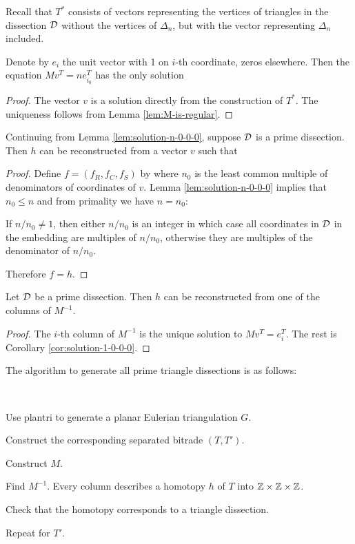 Recall that $T^*$ consists of vectors representing the vertices of triangles in the dissection $\mathcal D$ without the vertices of $\Delta_n$, but with the vector representing $\Delta_n$ included.

\begin{lem}
\label{lem:solution-n-0-0-0}
Denote by $e_i$ the unit vector with 1 on $i$-th coordinate, zeros elsewhere. Then the equation $Mv^T = ne_{i_0}^T$ has the only solution
%
\end{lem}
\begin{proof}
The vector $v$ is a solution directly from the construction of $T^*$. The uniqueness follows from Lemma \ref{lem:M-is-regular}.
\end{proof}

\begin{cor}
\label{cor:solution-1-0-0-0}
Continuing from Lemma \ref{lem:solution-n-0-0-0}, suppose $\mathcal D$ is a prime dissection. Then $h$ can be reconstructed from a vector $v$ such that
%
\end{cor}
\begin{proof}
Define $f = (f_R, f_C, f_S)$ by
%
where $n_0$ is the least common multiple of denominators of coordinates of $v$. Lemma \ref{lem:solution-n-0-0-0} implies that $n_0 \leq n$ and from primality we have $n = n_0$:

If $n/n_0 \ne 1$, then either $n/n_0$ is an integer in which case all coordinates in $\mathcal D$ in the embedding are multiples of $n/n_0$, otherwise they are multiples of the denominator of $n/n_0$.

Therefore $f=h$.
\end{proof}

\begin{lem}
Let $\mathcal D$ be a prime dissection. Then $h$ can be reconstructed from one of the columns of $M^{-1}$.
\end{lem}%
\begin{proof}
The $i$-th column of $M^{-1}$ is the unique solution to $Mv^T = e_i^T$. The rest is Corollary \ref{cor:solution-1-0-0-0}.
\end{proof}

The algorithm to generate all prime triangle dissections is as follows:

\begin{alg}\ 
\begin{cosyenumerate}
	\item Use plantri to generate a planar Eulerian triangulation $G$.
	\item Construct the corresponding separated bitrade $(T,T')$.
	\item Construct $M$.
	\item Find $M^{-1}$. Every column describes a homotopy $h$ of $T$ into $\mathbb Z\times\mathbb Z\times\mathbb Z$.
	\item Check that the homotopy corresponds to a triangle dissection.
	\item Repeat for $T'$.
\end{cosyenumerate}
\end{alg}%

